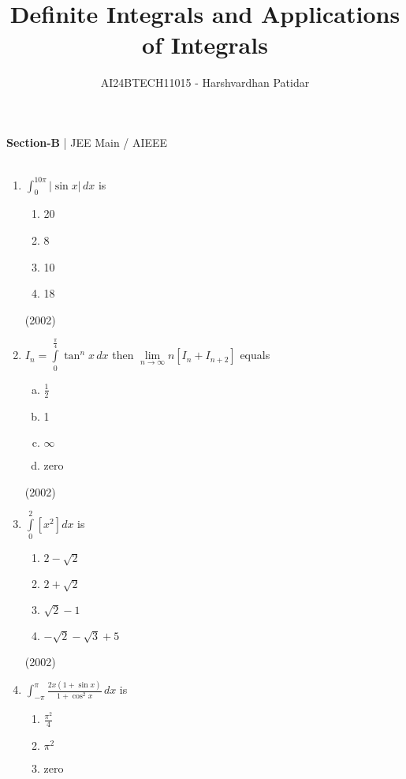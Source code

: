 \documentclass[journal,12pt,twocolumn]{IEEEtran}
\theoremstyle{remark}
\begin{document}

\vspace{3cm}

\title{Definite Integrals and Applications of Integrals}
\author{AI24BTECH11015 - Harshvardhan Patidar}
\maketitle
\newpage
\bigskip

\renewcommand{\thefigure}{\theenumi}
\renewcommand{\thetable}{\theenumi}


\textbf{Section-B} | JEE Main / AIEEE \\ \\
\begin{enumerate}
	\item 
		$\int_0^{10\pi} | \sin x| \, dx$ is  
		\begin{enumerate}
			\item 20\item 8\item 10\item 18
		\end{enumerate} 
		\hfill (2002)
	\item
			$I_n = \int \limits_{0}^{\frac{\pi}{4}} \tan^n x \, dx$ then $\lim \limits_{n \to \infty} n[I_n + I_{n+2}]$ equals 
				\begin{enumerate} [(a)]
					\item $\frac{1}{2}$
	 				\item 1
					\item $\infty$
					\item zero
	 			\end{enumerate}
				\hfill(2002)
	\item
		$ \int \limits_0^2 [x^2]dx $ is  
			\begin{enumerate}
				\item $2-\sqrt2$
				 \item $2+\sqrt2$
				\item $\sqrt2 - 1$
				\item $-\sqrt2 - \sqrt3 + 5$
			\end{enumerate}
			\hfill (2002)
	\item 
		$ \int_{-\pi}^{\pi} \frac{2x(1 + \sin x)}{1+\cos^2 x} \, dx$ is
			\begin{enumerate}
					\item $\frac{\pi^2}{4}$
					\item $\pi^2$
					\item zero

\end{enumerate}
\end{enumerate}
\end{document}
